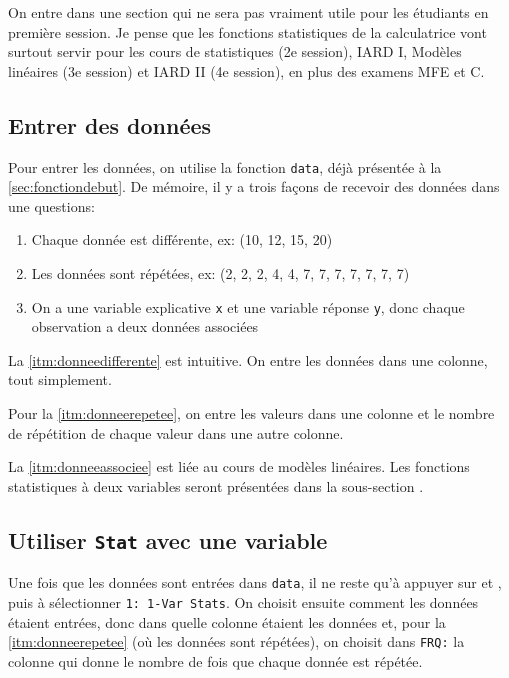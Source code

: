 On entre dans une section qui ne sera pas vraiment utile pour les étudiants en première session. Je pense que les fonctions statistiques de la calculatrice vont surtout servir pour les cours de statistiques (2e session), IARD I, Modèles linéaires (3e session) et IARD II (4e session), en plus des examens MFE et C.

\subsection{Entrer des données}
\label{subsec:EntrerDonnees}

Pour entrer les données, on utilise la fonction \texttt{data}, déjà présentée à la \autoref{sec:fonctiondebut}. De mémoire, il y a trois façons de recevoir des données dans une questions:

\begin{enumerate}

\item Chaque donnée est différente, ex: (10, 12, 15, 20)
\label{itm:donneedifferente}

\item Les données sont répétées, ex: (2, 2, 2, 4, 4, 7, 7, 7, 7, 7, 7, 7)
\label{itm:donneerepetee}

\item On a une variable explicative \texttt{x} et une variable réponse \texttt{y}, donc chaque observation a deux données associées
\label{itm:donneeassociee}

\end{enumerate}

La \autoref{itm:donneedifferente} est intuitive. On entre les données dans une colonne, tout simplement.

Pour la \autoref{itm:donneerepetee}, on entre les valeurs dans une colonne et le nombre de répétition de chaque valeur dans une autre colonne.

La \autoref{itm:donneeassociee} est liée au cours de modèles linéaires. Les fonctions statistiques à deux variables seront présentées dans la sous-section .

\subsection{Utiliser \texttt{Stat} avec une variable}

Une fois que les données sont entrées dans \texttt{data}, il ne reste qu'à appuyer sur  et , puis à sélectionner \texttt{1: 1-Var Stats}. On choisit ensuite comment les données étaient entrées, donc dans quelle colonne étaient les données et, pour la \autoref{itm:donneerepetee} (où les données sont répétées), on choisit dans \texttt{FRQ:} la colonne qui donne le nombre de fois que chaque donnée est répétée.

